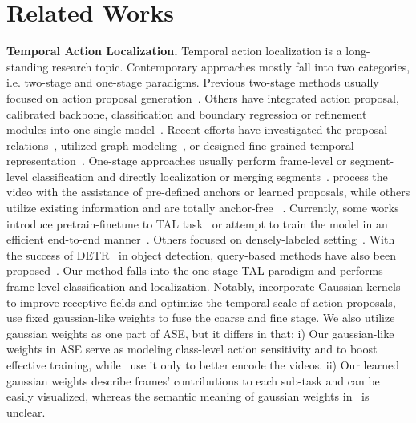 \documentclass[10pt,twocolumn,letterpaper]{article}
\begin{document}
\section{Related Works}
\par \textbf{Temporal Action Localization.} Temporal action localization is a long-standing research topic. Contemporary approaches mostly fall into two categories, i.e. two-stage and one-stage paradigms. Previous two-stage methods usually focused on action proposal generation~\cite{lin2019bmn,BSN2018arXiv,su2021bsn++, rtdnet,wang2022rcl}. Others have integrated action proposal, calibrated backbone, classification and boundary regression or refinement modules into one single model~\cite{shou2016temporalmscnn,rc3d,shou2017cdc,SSN2017ICCV}.  Recent efforts have investigated the proposal relations~\cite{PGCN2019ICCV, contextloc, relation},   utilized graph modeling~\cite{xu2020gtad,PGCN2019ICCV}, or designed fine-grained temporal representation~\cite{tcanet,sridhar2021class}. One-stage approaches usually perform frame-level or segment-level classification and directly localization or merging segments~\cite{shou2017cdc, bottomup, ssd}. \cite{vsgn,gtan} process the video with the assistance of pre-defined anchors or learned proposals, while others utilize existing information and are totally anchor-free ~\cite{afsd,zhang2022actionformer,segtad}. Currently, some works introduce pretrain-finetune to TAL task~\cite{boundarysensitivepretrain,xumengmenglow} or attempt to train the model in an efficient end-to-end manner~\cite{tadtr,cheng2022tallformer,etad}. Others focused on densely-labeled setting~\cite{mlad,dai2021pdan,dai2022mstct,kahatapitiya2021coarsefine,tanpointtad,dai2021ctrn}. With the success of DETR~\cite{detr} in object detection, query-based methods have also been proposed~\cite{shi2022react,rtdnet,tanpointtad, tadtr}. Our method falls into the one-stage TAL paradigm and performs frame-level classification and localization.  Notably, \cite{tgm,gtan} incorporate Gaussian kernels to improve receptive fields and optimize the temporal scale of action proposals, \cite{kahatapitiya2021coarsefine} use fixed gaussian-like weights to fuse the coarse and fine stage. We also utilize gaussian weights as one part of ASE, but it differs in that: 
i) Our gaussian-like weights in ASE serve as modeling class-level action sensitivity and to boost effective training, while~\cite{kahatapitiya2021coarsefine,tgm,gtan} use it only to better encode the videos. 
ii) Our learned gaussian weights describe frames' contributions to each sub-task and can be easily visualized, whereas the semantic meaning of gaussian weights in~\cite{kahatapitiya2021coarsefine,tgm,gtan} is unclear.
\end{document}
